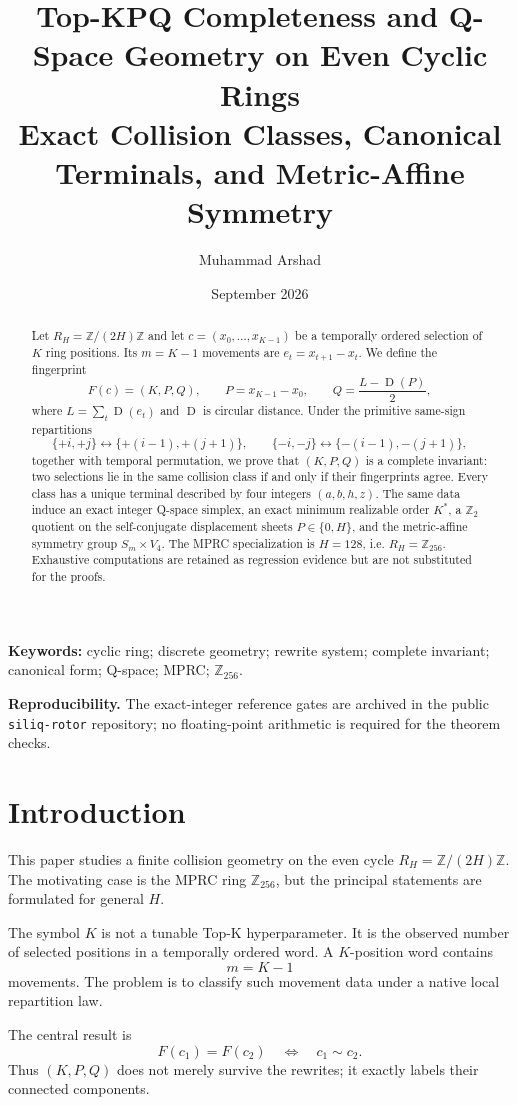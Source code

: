 \documentclass[11pt]{article}
\title{\textbf{Top-KPQ Completeness and Q-Space Geometry on Even Cyclic Rings}\\
Exact Collision Classes, Canonical Terminals, and Metric-Affine Symmetry}
\author{Muhammad Arshad}
\date{September 2026}
\theoremstyle{definition}
\newcommand{\Z}{\mathbb{Z}}
\newcommand{\D}{\operatorname{D}}
\newcommand{\1}{\mathbf{1}}
\begin{document}
\maketitle

\begin{abstract}
Let $R_H=\Z/(2H)\Z$ and let $c=(x_0,\ldots,x_{K-1})$ be a temporally ordered selection of $K$ ring positions. Its $m=K-1$ movements are $e_t=x_{t+1}-x_t$. We define the fingerprint
\[
F(c)=(K,P,Q),\qquad
P=x_{K-1}-x_0,\qquad
Q=\frac{L-\D(P)}2,
\]
where $L=\sum_t \D(e_t)$ and $\D$ is circular distance. Under the primitive same-sign repartitions
\[
\{+i,+j\}\leftrightarrow\{+(i-1),+(j+1)\},
\qquad
\{-i,-j\}\leftrightarrow\{-(i-1),-(j+1)\},
\]
together with temporal permutation, we prove that $(K,P,Q)$ is a complete invariant: two selections lie in the same collision class if and only if their fingerprints agree. Every class has a unique terminal described by four integers $(a,b,h,z)$. The same data induce an exact integer Q-space simplex, an exact minimum realizable order $K^\ast$, a $\Z_2$ quotient on the self-conjugate displacement sheets $P\in\{0,H\}$, and the metric-affine symmetry group $S_m\times V_4$. The MPRC specialization is $H=128$, i.e. $R_H=\Z_{256}$. Exhaustive computations are retained as regression evidence but are not substituted for the proofs.
\end{abstract}

\noindent\textbf{Keywords:} cyclic ring; discrete geometry; rewrite system; complete invariant; canonical form; Q-space; MPRC; $\Z_{256}$.

\medskip
\noindent\textbf{Reproducibility.}
The exact-integer reference gates are archived in the public \texttt{siliq-rotor} repository; no floating-point arithmetic is required for the theorem checks.

\section{Introduction}
This paper studies a finite collision geometry on the even cycle $R_H=\Z/(2H)\Z$. The motivating case is the MPRC ring $\Z_{256}$, but the principal statements are formulated for general $H$.

The symbol $K$ is not a tunable Top-K hyperparameter. It is the observed number of selected positions in a temporally ordered word. A $K$-position word contains
\[
m=K-1
\]
movements. The problem is to classify such movement data under a native local repartition law.

The central result is
\[
F(c_1)=F(c_2)\quad\Longleftrightarrow\quad c_1\sim c_2.
\]
Thus $(K,P,Q)$ does not merely survive the rewrites; it exactly labels their connected components.
\end{document}
